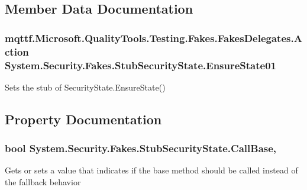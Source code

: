 \subsection{Member Data Documentation}
\hypertarget{class_system_1_1_security_1_1_fakes_1_1_stub_security_state_ae9790ee12847a6ebfb3be26b18bd5af9}{
\subsubsection[{Ensure\-State01}]{\setlength{\rightskip}{0pt plus 5cm}mqttf.\-Microsoft.\-Quality\-Tools.\-Testing.\-Fakes.\-Fakes\-Delegates.\-Action System.\-Security.\-Fakes.\-Stub\-Security\-State.\-Ensure\-State01}}\label{class_system_1_1_security_1_1_fakes_1_1_stub_security_state_ae9790ee12847a6ebfb3be26b18bd5af9}


Sets the stub of Security\-State.\-Ensure\-State()



\subsection{Property Documentation}
\hypertarget{class_system_1_1_security_1_1_fakes_1_1_stub_security_state_a4d0ff3ba111c65a382f0f57c93140770}{
\subsubsection[{Call\-Base}]{\setlength{\rightskip}{0pt plus 5cm}bool System.\-Security.\-Fakes.\-Stub\-Security\-State.\-Call\-Base\hspace{0.3cm}{\ttfamily [get]}, {\ttfamily [set]}}}\label{class_system_1_1_security_1_1_fakes_1_1_stub_security_state_a4d0ff3ba111c65a382f0f57c93140770}


Gets or sets a value that indicates if the base method should be called instead of the fallback behavior

